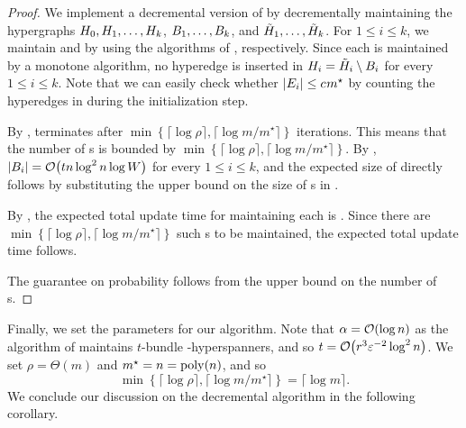 \begin{proof}
We implement a decremental version of  by decrementally maintaining the hypergraphs \( { H_0}, { H_1}, \dots, { H_k} \), \( { B_1}, \dots, { B_k} \), and \( { \tilde H_1}, \dots, { \tilde H_k} \).
For \( 1 \leq i \leq k \), we maintain  and  by using the algorithms of , respectively.
Since each  is maintained by a monotone algorithm, no hyperedge is inserted in \( { H_i} = { \tilde H_i} \setminus {\ensuremath{ B_i}} \) for every \( 1 \leq i \leq k \).
Note that we can easily check whether \( |E_i| \leq c_{ } m^\star \) by counting the hyperedges in  during the initialization step.

By ,  terminates after \( \min\left\{ \lceil \log \rho \rceil, \lceil \log m / m^\star \rceil \right\} \) iterations.
This means that the number of s is bounded by \( \min\left\{ \lceil \log \rho \rceil, \lceil \log m / m^\star \rceil \right\} \).
By , \( |\hypergraph{B_i}| = \atmost{t n  \log ^2 n \log W} \) for every \( 1 \leq i \leq k \), and the expected size of  directly follows by substituting the upper bound on the size of s in .

By , the expected total update time for maintaining each  is .
Since there are \( \min\left\{ \lceil \log \rho \rceil, \lceil \log m / m^\star \rceil \right\} \) such s to be maintained, the expected total update time follows.

The guarantee on probability follows from the upper bound on the number of s.
\end{proof}









Finally, we set the parameters for our algorithm.
Note that \( \alpha = \atmost{\log n} \) as the algorithm of  maintains \( t \)-bundle -hyperspanners, and so \( t = \atmost{ r^3 \varepsilon ^{-2} \log ^2 n} \).
We set \( \rho =  \Theta\left( m \right) \) and \( m^\star = n = \poly{n} \), and so
\begin{equation*}
\min\left\{ \lceil \log \rho \rceil, \lceil \log m / m^\star \rceil \right\} = \lceil \log m \rceil.
\end{equation*}
We conclude our discussion on the decremental algorithm in the following corollary.

